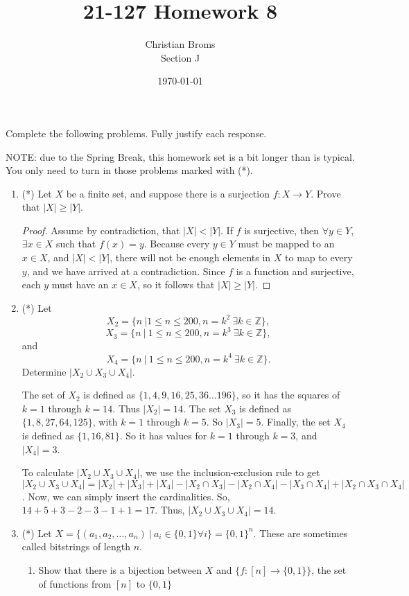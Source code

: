 \documentclass[12pt]{article}
\newcommand{\Z}{\mathbb{Z}}
\begin{document}
\title{21-127 Homework 8
}
\author{Christian Broms \\ Section J}
\date{\today}
\maketitle

Complete the following problems. Fully justify each response.

NOTE: due to the Spring Break, this homework set is a bit longer than is typical. You only need to turn in those problems marked with (*).

\begin{enumerate}


\item (*) Let $X$ be a finite set, and suppose there is a surjection $f:X\to Y$. Prove that $|X|\geq |Y|$. 
\begin{proof}

Assume by contradiction, that $|X| < |Y|$. 
If $f$ is surjective, then $\forall y \in Y$, $\exists x \in X$ such that $f(x) = y$. Because every $y \in Y$ must be mapped to an $x \in X$, and $|X| < |Y|$, there will not be enough elements in $X$ to map to every $y$, and we have arrived at a contradiction. Since $f$ is a function and surjective, each $y$ must have an $x \in X$, so it follows that $|X|\geq |Y|$.
\end{proof}

\item (*) Let \[X_2=\{n\ | 1\leq n\leq 200, n=k^2\ \exists k\in \Z\},\] \[X_3=\{n\ | \ 1\leq n\leq 200, n=k^3\ \exists k\in \Z\},\] and \[X_4 = \{n\ | \ 1\leq n\leq 200, n=k^4\ \exists k\in \Z\}.\] Determine $|X_2\cup X_3\cup X_4|$.

The set of $X_2$ is defined as $\{1, 4, 9, 16, 25, 36 \dots 196\}$, so it has the squares of $k = 1$ through $k = 14$. Thus $|X_2| = 14$. The set $X_3$ is defined as $\{1, 8, 27, 64, 125\}$, with $k = 1$ through $k = 5$. So $|X_3| = 5$. Finally, the set $X_4$ is defined as $\{1, 16, 81\}$. So it has values for $k = 1$ through $k = 3$, and $|X_4| = 3$. 

To calculate $|X_2\cup X_3\cup X_4|$, we use the inclusion-exclusion rule to get $|X_2\cup X_3\cup X_4| = |X_2| + |X_3| + |X_4| - |X_2 \cap X_3| - |X_2 \cap X_4| - |X_3 \cap X_4| + |X_2 \cap X_3 \cap X_4|$.  Now, we can simply insert the cardinalities. So, $14 + 5 + 3 - 2 - 3 - 1 + 1 = 17$. Thus, $|X_2\cup X_3\cup X_4| = 14$. 


\item (*) Let $X=\{ (a_1, a_2, \dots, a_n)\ | \ a_i\in\{0,1\}\forall i\} = \{0,1\}^n$. These are sometimes called bitstrings of length $n$.
\begin{enumerate}
\item Show that there is a bijection between $X$ and $\{f:[n]\to\{0,1\}\}$, the set of functions from $[n]$ to $\{0,1\}$


\end{enumerate}
\end{enumerate}
\end{document}
